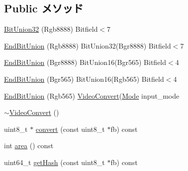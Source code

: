 \subsection*{Public メソッド}
\begin{DoxyCompactItemize}
\item 
\hyperlink{classVideoConvert_aefe4fbfd52e592e91aee05d5814ce23b}{BitUnion32} (Rgb8888) Bitfield$<$7
\item 
\hyperlink{classVideoConvert_a4773afbbd60896bb01da63f019215893}{EndBitUnion} (Rgb8888) BitUnion32(Bgr8888) Bitfield$<$7
\item 
\hyperlink{classVideoConvert_afadfb7851997f9fb787490995c281037}{EndBitUnion} (Bgr8888) BitUnion16(Bgr565) Bitfield$<$4
\item 
\hyperlink{classVideoConvert_a86b1b56dda6a6798fe7774f250fd658a}{EndBitUnion} (Bgr565) BitUnion16(Rgb565) Bitfield$<$4
\item 
\hyperlink{classVideoConvert_aeecd01b88aca2832c32a16728474c9d7}{EndBitUnion} (Rgb565) \hyperlink{classVideoConvert}{VideoConvert}(\hyperlink{classVideoConvert_a46c8a310cf4c094f8c80e1cb8dc1f911}{Mode} input\_\-mode
\item 
\hyperlink{classVideoConvert_a79b61dd8dc5db73c15b8bba9ce175923}{$\sim$VideoConvert} ()
\item 
uint8\_\-t $\ast$ \hyperlink{classVideoConvert_a9d6b4342acae62e284ca3a200af30554}{convert} (const uint8\_\-t $\ast$fb) const 
\item 
int \hyperlink{classVideoConvert_a93dbb554c75a0bded227ab0320be72eb}{area} () const 
\item 
uint64\_\-t \hyperlink{classVideoConvert_a26a77d167a3bfe87e9159a8e2a1f96cb}{getHash} (const uint8\_\-t $\ast$fb) const 
\end{DoxyCompactItemize}
